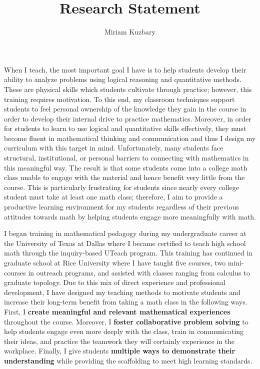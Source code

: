 \documentclass[11pt]{amsart}
\title{Research Statement}
\author{Miriam Kuzbary}
\theoremstyle{plain}
\theoremstyle{definition}
\theoremstyle{remark}
\begin{document}
\thispagestyle{fancy}

When I teach, the most important goal I have is to help students develop their ability to analyze problems using logical reasoning and quantitative methods. These are physical skills which students cultivate through practice; however, this training requires motivation. To this end, my classroom techniques support students to feel personal ownership of the knowledge they gain in the course in order to develop their internal drive to practice mathematics. Moreover, in order for students to learn to use logical and quantitative skills effectively, they must become fluent in mathematical thinking and communication and thus I design my curriculum with this target in mind. Unfortunately, many students face structural, institutional, or personal barriers to connecting with mathematics in this meaningful way. The result is that some students come into a college math class unable to engage with the material and hence benefit very little from the course. This is particularly frustrating for students since nearly every college student must take at least one math class; therefore, I aim to provide a productive learning environment for my students regardless of their previous attitudes towards math by helping students engage more meaningfully with math.

I began training in mathematical pedagogy during my undergraduate career at the University of Texas at Dallas where I became certified to teach high school math through the inquiry-based UTeach program. This training has continued in graduate school at Rice University where I have taught five courses, two mini-courses in outreach programs, and assisted with classes ranging from calculus to graduate topology. Due to this mix of direct experience and professional development, I have designed my teaching methods to motivate students and increase their long-term benefit from taking a math class in the following ways. First, I \textbf{create meaningful and relevant mathematical experiences} throughout the course.  Moreover, I \textbf{foster collaborative problem solving} to help students engage even more deeply with the class, train in communicating their ideas, and practice the teamwork they will certainly experience in the workplace. Finally, I give students \textbf{multiple ways to demonstrate their understanding} while providing the scaffolding to meet high learning standards.
\end{document}

